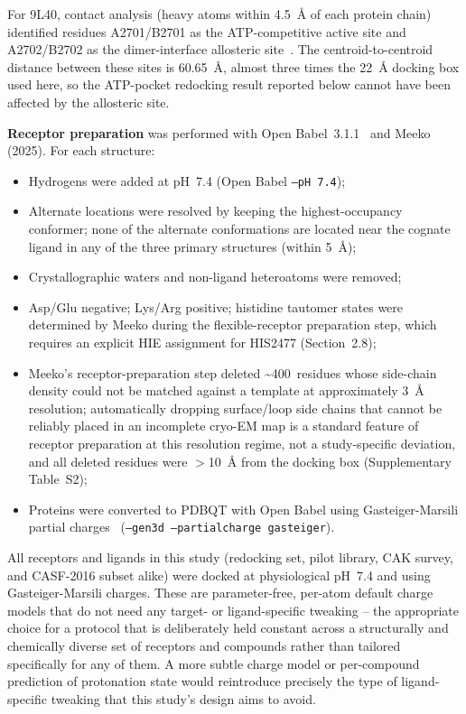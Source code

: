 \documentclass[global,twocolumn]{svjour}
\begin{document}
For 9L40, contact analysis (heavy atoms within 4.5~\AA{} of each protein
chain) identified residues A2701/B2701 as the ATP-competitive active site
and A2702/B2702 as the dimer-interface allosteric site~\cite{wang2025}. The
centroid-to-centroid distance between these sites is 60.65~\AA{}, almost
three times the 22~\AA{} docking box used here, so the ATP-pocket redocking
result reported below cannot have been affected by the allosteric site.

\textbf{Receptor preparation} was performed with Open Babel~3.1.1~\cite{oboyle2011}
and Meeko (2025). For each structure:
\begin{itemize}\sloppy
\item Hydrogens were added at pH~7.4 (Open Babel \texttt{--pH 7.4});
\item Alternate locations were resolved by keeping the highest-occupancy
  conformer; none of the alternate conformations are located near the
  cognate ligand in any of the three primary structures (within 5~\AA{});
\item Crystallographic waters and non-ligand heteroatoms were removed;
\item Asp/Glu negative; Lys/Arg positive; histidine tautomer states were
  determined by Meeko during the flexible-receptor preparation step, which
  requires an explicit HIE assignment for HIS2477 (Section~2.8);
\item Meeko's receptor-preparation step deleted \textasciitilde400~residues
  whose side-chain density could not be matched against a template at
  approximately 3~\AA{} resolution; automatically dropping surface/loop
  side chains that cannot be reliably placed in an incomplete cryo-EM map
  is a standard feature of receptor preparation at this resolution regime,
  not a study-specific deviation, and all deleted residues were $>$10~\AA{}
  from the docking box (Supplementary Table~S2);
\item Proteins were converted to PDBQT with Open Babel using Gasteiger-Marsili
  partial charges~\cite{gas_marsili} (\texttt{--gen3d --partialcharge
  gasteiger}).
\end{itemize}

All receptors and ligands in this study (redocking set, pilot library, CAK
survey, and CASF-2016 subset alike) were docked at physiological pH~7.4 and
using Gasteiger-Marsili charges. These are parameter-free, per-atom default
charge models that do not need any target- or ligand-specific tweaking --
the appropriate choice for a protocol that is deliberately held constant
across a structurally and chemically diverse set of receptors and compounds
rather than tailored specifically for any of them. A more subtle charge
model or per-compound prediction of protonation state would reintroduce
precisely the type of ligand-specific tweaking that this study's design
aims to avoid.
\end{document}
